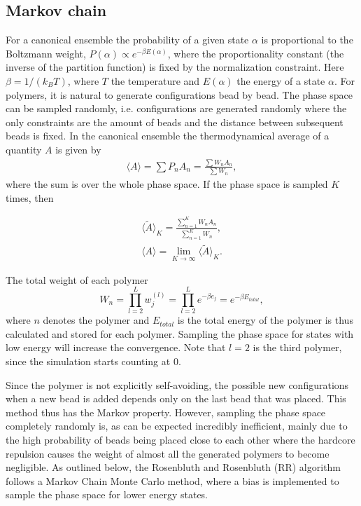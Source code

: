 \subsection{Markov chain}
For a canonical ensemble the probability of a given state $\alpha$ is proportional to the Boltzmann weight, $P(\alpha) \propto e^{-\beta E(\alpha)}$, where the proportionality constant (the inverse of the partition function) is fixed by the normalization constraint.  Here $\beta=1/\left(k_B T\right)$, where $T$ the temperature and $E(\alpha)$ the energy of a state $\alpha$. For polymers, it is natural to generate configurations bead by bead. The phase space can be sampled randomly, i.e. configurations are generated randomly where the only constraints are the amount of beads and the distance between subsequent beads is fixed.
In the canonical ensemble the thermodynamical average of a quantity $A$ is given by
\begin{gather}
	\langle A \rangle = \sum P_nA_n = \frac{\sum W_n A_n}{\sum W_n},
\end{gather}
where the sum is over the whole phase space. If the phase space is sampled $K$ times, then

\begin{gather}
	\langle \tilde{A} \rangle_{K} = \frac{\sum_{n=1}^K W_n A_n}{\sum_{n=1}^K W_n},\\
	\langle A \rangle = \lim_{K\rightarrow \infty}\langle \tilde{A} \rangle_{K}.
\end{gather}


The total weight of each polymer
\begin{equation}\label{eq:polymer_weight}
    W_n = \prod_{l=2}^L w_j^{(l)} = \prod_{l=2}^Le^{-\beta e_j} = e^{-\beta E_{total}},
\end{equation} where $n$ denotes the polymer and $E_{total}$ is the total energy of the polymer is thus calculated and stored for each polymer. Sampling the phase space for states with low energy will increase the convergence. Note that $l=2$ is the third polymer, since the simulation starts counting at $0$.

 Since the polymer is not explicitly self-avoiding, the possible new configurations when a new bead is added depends only on the last bead that was placed. This method thus has the Markov property. However, sampling the phase space completely randomly is, as can be expected incredibly inefficient, mainly due to the high probability of beads being placed close to each other where the hardcore repulsion causes the weight of almost all the generated polymers to become negligible. As outlined below, the Rosenbluth and Rosenbluth (RR) algorithm\cite{rosenbluth1955monte} follows a Markov Chain Monte Carlo method, where a bias is implemented to sample the phase space for lower energy states.




